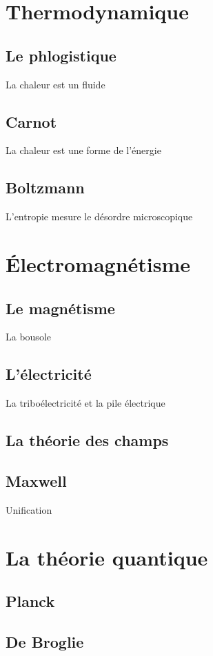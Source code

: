 \chapter{Thermodynamique}
  \section{Le phlogistique}
La chaleur est un fluide
  \section{Carnot}
La chaleur est une forme de l'énergie
  \section{Boltzmann}
L'entropie mesure le désordre microscopique

\chapter{Électromagnétisme}
  \section{Le magnétisme}
La bousole
  \section{L'électricité}
La triboélectricité et la pile électrique
  \section{La théorie des champs}
  \section{Maxwell}
Unification


\chapter{La théorie quantique}
  \section{Planck}
  \section{De Broglie}

